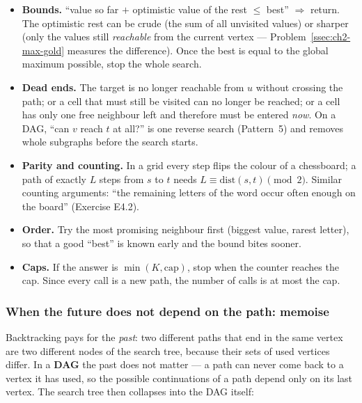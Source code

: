 \begin{itemize}[leftmargin=*]
    \item \textbf{Bounds.} ``value so far $+$ optimistic value of the rest $\le$ best'' $\Rightarrow$ return. The optimistic rest can be crude (the sum of all unvisited values) or sharper (only the values still \emph{reachable} from the current vertex --- Problem~\ref{ssec:ch2-max-gold} measures the difference). Once the best is equal to the global maximum possible, stop the whole search.
    \item \textbf{Dead ends.} The target is no longer reachable from $u$ without crossing the path; or a cell that must still be visited can no longer be reached; or a cell has only one free neighbour left and therefore must be entered \emph{now}. On a DAG, ``can $v$ reach $t$ at all?'' is one reverse search (Pattern~5) and removes whole subgraphs before the search starts.
    \item \textbf{Parity and counting.} In a grid every step flips the colour of a chessboard; a path of exactly $L$ steps from $s$ to $t$ needs $L \equiv \text{dist}(s,t) \pmod 2$. Similar counting arguments: ``the remaining letters of the word occur often enough on the board'' (Exercise E4.2).
    \item \textbf{Order.} Try the most promising neighbour first (biggest value, rarest letter), so that a good ``best'' is known early and the bound bites sooner.
    \item \textbf{Caps.} If the answer is $\min(K, \text{cap})$, stop when the counter reaches the cap. Since every call is a new path, the number of calls is at most the cap.
\end{itemize}

\subsubsection*{When the future does not depend on the path: memoise}

Backtracking pays for the \emph{past}: two different paths that end in the same vertex are two different nodes of the search tree, because their sets of used vertices differ. In a \textbf{DAG} the past does not matter --- a path can never come back to a vertex it has used, so the possible continuations of a path depend only on its last vertex. The search tree then collapses into the DAG itself:

